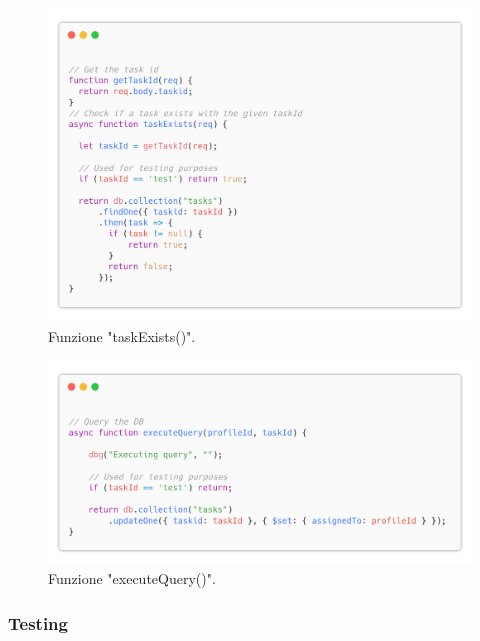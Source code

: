 \documentclass{report}
\begin{document}
\begin{figure}[H]
	\centering\includegraphics[width=1\textwidth]{images/code_task_exists.png}
	Funzione "taskExists()".
\end{figure}
\begin{figure}[H]
	\centering\includegraphics[width=1\textwidth]{images/code_scegli_task_query.png}
	Funzione "executeQuery()".
\end{figure}

\subsubsection*{Testing}
\end{document}
